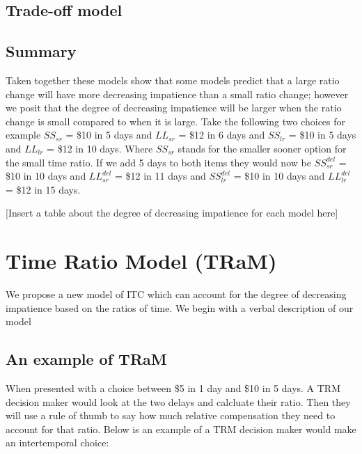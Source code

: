 \documentclass[]{article}
\begin{document}
\subsection{Trade-off model}


\subsection{Summary}
Taken together these models show that some models predict that a large ratio change will have more decreasing impatience than a small ratio change; however we posit that the degree of  decreasing impatience will be larger when the ratio change is small compared to when it is large.
Take the following two choices for example $SS_{sr}$ = \$10 in 5 days and $LL_{sr}$ = \$12 in 6 days and $SS_{lr}$ = \$10 in 5 days and $LL_{lr}$ = \$12 in 10 days. Where $SS_{sr}$ stands for the smaller sooner option for the small time ratio. 
If we add 5 days to both items they would now be $SS_{sr}^{del}$ = \$10 in 10 days and $LL_{sr}^{del}$ = \$12 in 11 days and $SS_{lr}^{del}$ = \$10 in 10 days and $LL_{lr}^{del}$ = \$12 in 15 days. 

[Insert a table about the degree of decreasing impatience for each model here]

\section{Time Ratio Model (TRaM)}

We propose a new model of ITC which can account for the degree of decreasing impatience based on the ratios of time. 
We begin with a verbal description of our model

\subsection{An example of TRaM}

When presented with a choice between \$5 in 1 day and \$10 in 5 days. 
A TRM decision maker would look at the two delays and calcluate their ratio. 
Then they will use a rule of thumb to say how much relative compensation they need to account for that ratio.
Below is an example of a TRM decision maker would make an intertemporal choice:
\end{document}
